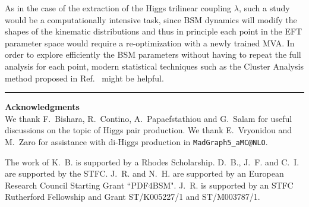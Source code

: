 As in the case of the extraction of the Higgs
trilinear coupling $\lambda$, such a study
would be a computationally intensive task, since
BSM dynamics will modify the shapes of the kinematic
distributions and thus in principle each point in the EFT parameter
space would require a re-optimization with a newly trained
MVA.
%
In order to explore efficiently the BSM parameters
without having to repeat the full analysis
for each point, modern statistical techniques
such as the Cluster Analysis method proposed
in Ref.~\cite{Dall'Osso:2015aia} might be helpful.

\bigskip
\bigskip
\begin{center}
\rule{5cm}{.1pt}
\end{center}
\bigskip
\bigskip

{\bf\noindent  Acknowledgments \\}
We thank F.~Bishara, R.~Contino, A.~Papaefstathiou and
G.~Salam for useful discussions on the topic
of Higgs pair production.
%
We thank E.~Vryonidou and M.~Zaro for
assistance with di-Higgs production
  in {\tt MadGraph5\_aMC@NLO}.

  \noindent
  The work of K.~B. is supported by a Rhodes Scholarship.
  D.~B., J.~F. and C.~I. are supported by the STFC.
  J.~R. and N.~H. are
supported by an European Research Council Starting Grant ``PDF4BSM".
%
  J.~R. is supported by an STFC Rutherford Fellowship and
  Grant ST/K005227/1 and ST/M003787/1.
